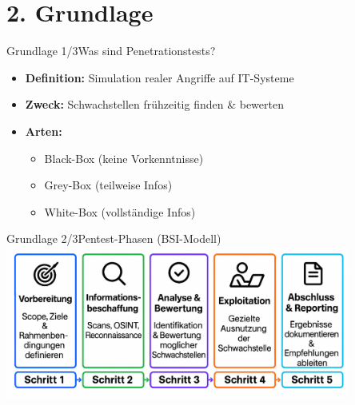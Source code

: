 \documentclass[
	aspectratio=169,	%
	onlytextwidth,		%
	t,					%
	]{beamer}
\begin{document}
\section{2. Grundlage}
\begin{frame}{Grundlage 1/3}{Was sind Penetrationstests?}
	\begin{itemize}
		\item \textbf{Definition:} Simulation realer Angriffe auf IT-Systeme
		\item \textbf{Zweck:} Schwachstellen frühzeitig finden \&  bewerten
		\item \textbf{Arten:}
		\begin{itemize}
			\item Black-Box (keine Vorkenntnisse)
			\item Grey-Box (teilweise Infos)
			\item White-Box (vollständige Infos)
		\end{itemize}
	\end{itemize}
\end{frame}


\begin{frame}{Grundlage 2/3}{Pentest-Phasen (BSI-Modell)}
	\centering
	\includegraphics[width=0.85\textwidth]{figures/Phase.png}
	\label{fig:phase}
\end{frame}
\end{document}
